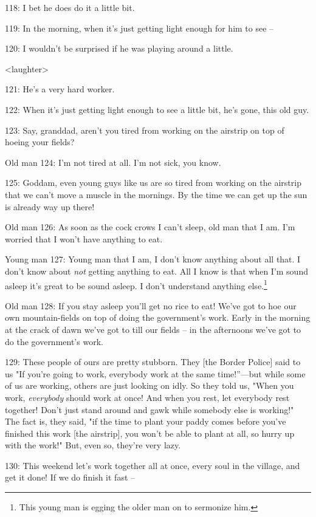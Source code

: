 118: I bet he does do it a little bit.

119: In the morning, when it's just getting light enough for him to see --

120: I wouldn't be surprised if he was playing around a little.

<laughter>

121: He's a very hard worker.

122: When it's just getting light enough to see a little bit, he's gone, this old
guy.

123: Say, granddad, aren't you tired from working on the airstrip on top of hoeing
your fields?

Old man 124: I'm not tired at all. I'm not sick, you know.

125: Goddam, even young guys like us are so tired from working on the airstrip
that we can't move a muscle in the mornings. By the time we can get up the sun
is already way up there!

Old man 126: As soon as the cock crows I can't sleep, old man that I am. I'm worried
that I won't have anything to eat.

Young man 127: Young man that I am, I don't know anything about all that. I don't
know about \textit{not} getting anything to eat. All I know is that when I'm sound
asleep it's great to be sound asleep. I don't understand anything else.\footnote{This young man is egging the older man on to sermonize him.}

Old man 128: If you stay asleep you'll get no rice to eat! We've got to hoe our
own mountain-fields on top of doing the government's work. Early in the morning
at the crack of dawn we've got to till our fields -- in the afternoons we've got
to do the government's work.

129: These people of ours are pretty stubborn. They [the Border Police] said to
us "If you're going to work, everybody work at the same time!''---but
while some of us are working, others are just looking on idly. So they told us,
"When you work, \textit{everybody} should work at once! And when you rest,
let everybody rest together! Don't just stand around and gawk while somebody else
is working!" The fact is, they said, "if the time to plant your
paddy comes before you've finished this work [the airstrip], you won't be able
to plant at all, so hurry up with the work!" But, even so, they're very
lazy.

130: This weekend let's work together all at once, every soul in the village, and
get it done! If we do finish it fast --

